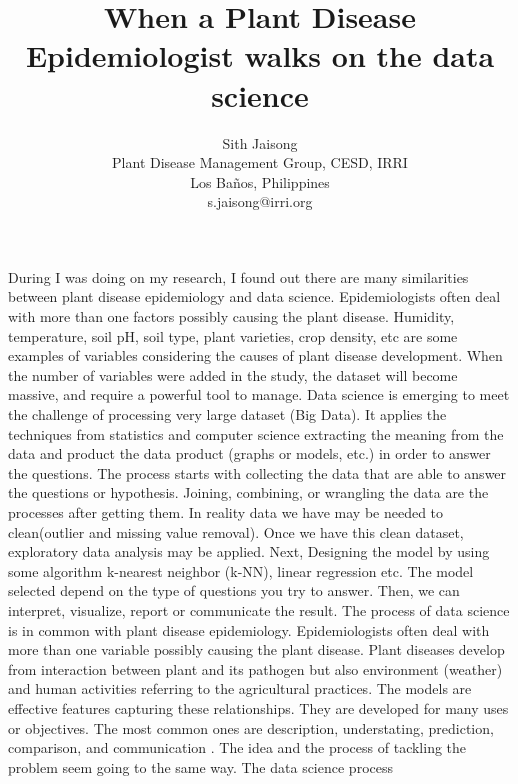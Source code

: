 \documentclass[12pt,a4paper]{article}
\begin{document}
\thispagestyle{empty}

\title{\textbf{When a Plant Disease Epidemiologist walks on the data science}}
\author{Sith Jaisong \\
Plant Disease Management Group, CESD, IRRI\\ Los Ba\~{n}os, Philippines\\
s.jaisong@irri.org}
\date{} %
\maketitle\thispagestyle{empty} %
During I was doing on my research, I found out there are many similarities between plant disease epidemiology and data science. Epidemiologists often deal with more than one factors possibly causing the plant disease. Humidity, temperature, soil pH, soil type, plant varieties, crop density, etc are some examples of variables considering the causes of plant disease development. When the number of variables were added in the study, the dataset will become massive, and require a powerful tool to manage. Data science is emerging to meet the challenge of processing very large dataset (Big Data). It applies the techniques from statistics and computer science extracting the meaning from the data and product the data product (graphs or models, etc.) in order to answer the questions. The process \cite{schutt2013doing} starts with collecting the data that are able to answer the questions or hypothesis. Joining, combining, or wrangling the data are the processes after getting them. In reality data we have may be needed to clean(outlier and missing value removal). Once we have this clean dataset, exploratory data analysis may be applied. Next, Designing the model by using some algorithm k-nearest neighbor (k-NN), linear regression etc. The model selected depend on the type of questions you try to answer. Then, we can interpret, visualize, report or communicate the result. The process of data science is in common with plant disease epidemiology. Epidemiologists often deal with more than one variable possibly causing the plant disease. Plant diseases develop from interaction between plant and its pathogen but also environment (weather) and human activities referring to the agricultural practices. The models are effective features capturing these relationships. They are developed for many uses or objectives. The most common ones are description, understating, prediction, comparison, and communication \cite{madden2007study}. The idea and the process of tackling the problem seem going to the same way. The data science process  
\end{document}
